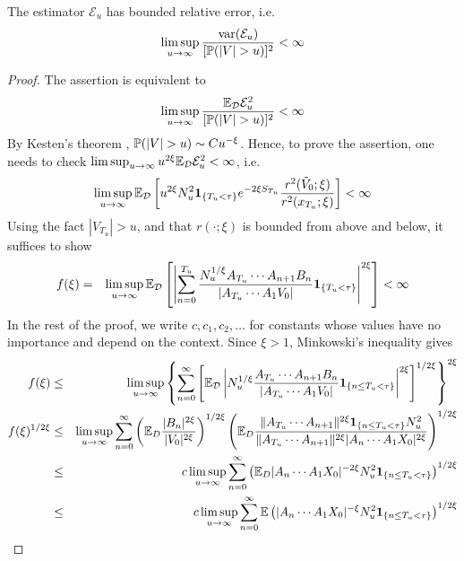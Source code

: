 \documentclass[aoas,preprint]{imsart}
\numberwithin{equation}{section}
\theoremstyle{plain}
\begin{document}
\begin{theorem}
  The estimator $\mathcal E_u$ has bounded relative error, i.e.
  \begin{equation*}
    \limsup_{u \to \infty} {\var(\mathcal E_u) \over [\P(|V| > u)]^2} < \infty
  \end{equation*}
\end{theorem}
\begin{proof}
  The assertion is equivalent to
  \[
  \limsup_{u \to \infty} {\E_{\mathcal D} \mathcal E_u^2 \over [\P(|V|
    > u)]^2} < \infty
  \]
  By Kesten's theorem \cite{Kesten1973}, $\P(|V| > u) \sim C
  u^{-\xi}$. Hence, to prove the assertion, one needs to check
  $\limsup_{u \to \infty} u^{2\xi}\E_{\mathcal D} \mathcal E_u^2 <
  \infty$, i.e.
  \[
  \limsup_{u \to \infty} \E_{\mathcal D}  \left[u^{2\xi}
    N_u^2 \1{T_u < \tau} e^{-2\xi S_{T_u}} {r^2(\tilde V_0; \xi)
      \over r^2(x_{T_u}; \xi)}\right] < \infty
 \]
 Using the fact $|V_{T_u}| > u$, and that $r(\cdot; \xi)$ is bounded
 from above and below, it suffices to show
 \begin{eqnarray}
   f(\xi) &=& \limsup_{u \to \infty} \E_{\mathcal D} \left[
     \left|
       \sum_{n=0}^{T_u}
       \frac{
         N_u^{1/\xi} A_{T_u} \cdots A_{n+1} B_n 
       }{
         |A_{T_u} \cdots A_1 V_0|
       }
       \1{T_u < \tau}
     \right|^{2 \xi}
   \right] < \infty \label{eq:efficiency_target}
 \end{eqnarray}
  In the rest of the proof, we write $c, c_1, c_2, \dots$ for
  constants whose values have no importance and depend on the
  context. Since $\xi > 1$, Minkowski's inequality gives
    \begin{eqnarray*}
      f(\xi) &\leq& \limsup_{u \to \infty}
      \left\{
        \sum_{n=0}^{\infty}
        \left[
          \E_{\mathcal D} \left|
            N_u^{1/\xi}
            \frac{
              A_{T_u} \cdots A_{n+1} B_n 
            }{
              |A_{T_u} \cdots A_1 V_0|
            }
            \1{n \leq T_u < \tau}
          \right|^{2 \xi}
        \right]^{1/2\xi}
      \right\}^{2\xi} \nonumber \\
      f(\xi)^{1/2\xi}
      &\leq& \limsup_{u \to \infty}
      \sum_{n=0}^\infty
      \left(
        \E_D {
          |B_n|^{2\xi}
          \over
          |V_0|^{2\xi}
        }
      \right)^{1/2\xi}
      \left(
        \E_D {
          \|A_{T_u} \cdots A_{n+1}\|^{2\xi}
          \1{n \leq T_u < \tau}
          N_u^2
          \over
          \|A_{T_u} \cdots A_{n+1}\|^{2\xi}
          |A_n \cdots A_1 X_0|^{2\xi}
        }
      \right)^{1/2\xi} \\
      &\leq&
      c \limsup_{u \to \infty}
      \sum_{n=0}^\infty
      \left(
        \E_D |A_n \cdots A_1 X_0|^{-2\xi}
        N_u^2
        \1{n \leq T_u < \tau}        
      \right)^{1/2\xi} \\
      &\leq&
      c \limsup_{u \to \infty}
      \sum_{n=0}^\infty
      \E \left(
        |A_n \cdots A_1 X_0|^{-\xi}
        N_u^2
        \1{n \leq T_u < \tau}        
      \right)^{1/2\xi} \label{eq:split_point}
    \end{eqnarray*}
    

\end{proof}
\end{document}
